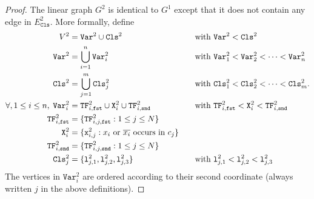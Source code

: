 \begin{proof}
    The linear graph $G^{2}$ is identical to $G^{1}$ except that it does not
    contain any edge in $E^{2}_{\texttt{Cls}}$.
    More formally,
    define
    \begin{alignat*} {2}
      V^{2} &= \texttt{Var}^{2} \cup \texttt{Cls}^{2}
      &\quad&\text{with $\texttt{Var}^{2} < \texttt{Cls}^{2}$}
      \\
      \texttt{Var}^{2} &= \bigcup_{i=1}^{n} \texttt{Var}^{2}_{i}
      &&\text{with $\texttt{Var}^{2}_1 < \texttt{Var}^{2}_2 < \dots < \texttt{Var}^{2}_n$}
      \\
      \texttt{Cls}^{2} &= \bigcup_{j=1}^{m} \texttt{Cls}^{2}_{j}
      &&\text{with $\texttt{Cls}^{2}_1 < \texttt{Cls}^{2}_2 < \dots < \texttt{Cls}^{2}_m$.}
      \\
      \forall, 1 \leq i \leq n,\;
      \texttt{Var}^{2}_{i} &= \texttt{TF}^{2}_{i,\texttt{fst}} \cup \texttt{X}^{2}_{i} \cup \texttt{TF}^{2}_{i,\texttt{snd}}
      &&\text{with $\texttt{TF}^{2}_{i,\texttt{fst}} < \texttt{X}^{2}_{i} < \texttt{TF}^{2}_{i,\texttt{snd}}$}
      \\
      \texttt{TF}^{2}_{i,\texttt{fst}}
      &=
      \{\texttt{TF}^{2}_{i,j,\texttt{fst}} : 1 \leq j \leq N\}
      &&\\
      \texttt{X}^{2}_{i}
      &=
      \{\texttt{x}^{2}_{i,j} : \text{$x_{i}$ or $\overline{x_{i}}$ occurs in $c_{j}$}\}
      &&\\
      \texttt{TF}^{2}_{i,\texttt{snd}}
      &=
      \{\texttt{TF}^{2}_{i,j,\texttt{snd}} : 1 \leq j \leq N\}
      &&
      \\
      \texttt{Cls}^{2}_{j}
      &=
      \{
      \texttt{l}^{2}_{j,1},
      \texttt{l}^{2}_{j,2},
      \texttt{l}^{2}_{j,3}
      \}
      &&\text{with $\texttt{l}^{2}_{j,1} < \texttt{l}^{2}_{j,2} < \texttt{l}^{2}_{j,3}$}
      \\
    \end{alignat*}
    The vertices in $\texttt{Var}^{2}_{i}$ are ordered according to their second coordinate
    (always written $j$ in the above definitions).


\end{proof}
